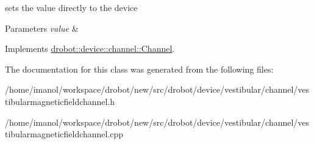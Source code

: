 sets the value directly to the device 


\begin{DoxyParams}{Parameters}
{\em value} & \\
\hline
\end{DoxyParams}


Implements \hyperlink{classdrobot_1_1device_1_1channel_1_1Channel_a612a3f6afe59e238583d6d40d9ddcaf8}{drobot\-::device\-::channel\-::\-Channel}.



The documentation for this class was generated from the following files\-:\begin{DoxyCompactItemize}
\item 
/home/imanol/workspace/drobot/new/src/drobot/device/vestibular/channel/vestibularmagneticfieldchannel.\-h\item 
/home/imanol/workspace/drobot/new/src/drobot/device/vestibular/channel/vestibularmagneticfieldchannel.\-cpp\end{DoxyCompactItemize}
